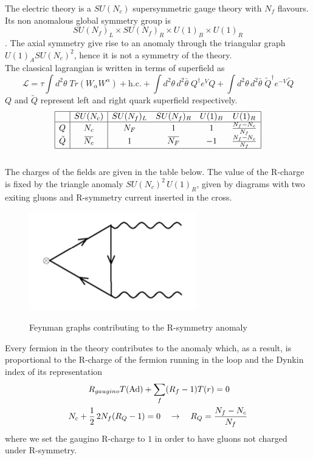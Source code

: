 The electric theory is a $SU(N_c) $ supersymmetric gauge theory with $N_f$ flavours.
Its non anomalous global symmetry group is 
$$
SU(N_f)_L \times SU(N_f)_R \times U(1)_B \times U(1)_R 
\label{eqn:seib_dual_global_symm_group}
$$.
The axial symmetry give rise to an anomaly through the triangular graph $U(1)_A SU(N_c)^2$, hence it is not a symmetry of the theory.\\ 
The classical lagrangian is written in terms of superfield as
\begin{equation}
 \mathcal{L} = \tau \int d^2 \theta \; Tr ( W_{\alpha} W^{\alpha} ) + \mathrm{h.c.} + 
 \int d^2 \theta \, d^2 \bar{\theta} \;  {Q}^{\dagger} e^{ V} Q +
 \int d^2 \theta \, d^2 \bar{\theta} \; {\tilde{Q}^{\dagger}} e^{- V} \tilde{Q}
 \end{equation} 
$Q$ and $\tilde{Q}$ represent left and right quark superfield respectively.
\begin{equation}
 \begin{array}{| c | c |  c c c c |}
 \hline
 & SU(N_c) & SU(N_f)_L  &SU(N_f)_R   & U(1)_B &  U(1)_R \\
\hline
Q & N_c & N_F & 1   &  1  &  \frac{N_f - N_c}{N_f}  \\
\tilde{Q} &\overbar{N_c}  &  1 & \overbar{ N_F}   & -1   &  \frac{N_f - N_c}{N_f}   \\	 
\hline
 \end{array} 
 \label{tab:suN_elect_charge}
\end{equation}
\\
The charges of the fields are given in the table below.
The value of the R-charge is fixed by the triangle anomaly $SU(N_c)^2 \, U(1)_R $, given by diagrams with two exiting gluons and R-symmetry current inserted in the cross.
\begin{figure}
\centering
\includegraphics[scale=0.6]{r-symm_anomlay.png}
\label{fig:r_symm_triangle_anom}
\caption{Feynman graphs contributing to the R-symmetry anomaly}

\end{figure}
Every fermion in the theory contributes to the anomaly which, as a result, is proportional to the R-charge of the fermion running in the loop and the Dynkin index of its representation
\begin{align}
R_{gaugino} T (\hbox{Ad}) + \sum_{ f} (& R_{f} - 1)  T(r)   = 0 
\label{eqn:r_symm_anom_condition}
\\
N_c + \frac{1}{2}\,  2 N_f (R_Q -1)  = 0 \quad & \rightarrow \quad R_Q = \frac{N_f - N_c}{N_f}
\end{align}
where we set the gaugino R-charge to $1$ in order to have gluons not charged under R-symmetry.

